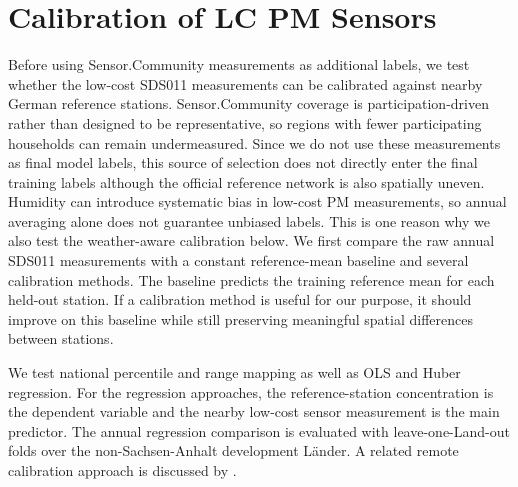\documentclass[english, a4paper]{article}
\begin{document}
\section{Calibration of LC PM Sensors}

Before using Sensor.Community measurements as additional labels, we test whether the low-cost SDS011 measurements can be calibrated against nearby German reference stations. Sensor.Community coverage is participation-driven rather than designed to be representative, so regions with fewer participating households can remain undermeasured. Since we do not use these measurements as final model labels, this source of selection does not directly enter the final training labels although the official reference network is also spatially uneven. Humidity can introduce systematic bias in low-cost PM measurements, so annual averaging alone does not guarantee unbiased labels. This is one reason why we also test the weather-aware calibration below. We first compare the raw annual SDS011 measurements with a constant reference-mean baseline and several calibration methods. The baseline predicts the training reference mean for each held-out station. If a calibration method is useful for our purpose, it should improve on this baseline while still preserving meaningful spatial differences between stations.

We test national percentile and range mapping as well as OLS and Huber regression. For the regression approaches, the reference-station concentration is the dependent variable and the nearby low-cost sensor measurement is the main predictor. The annual regression comparison is evaluated with leave-one-Land-out folds over the non-Sachsen-Anhalt development Länder. A related remote calibration approach is discussed by \citet{weissert2023moma}.
\end{document}
